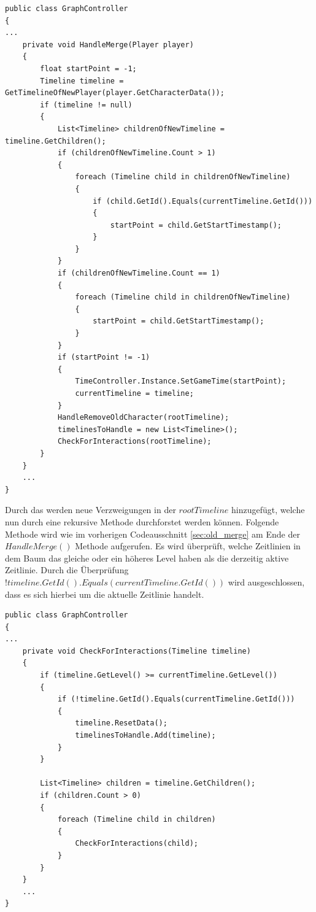 \begin{lstlisting}[caption={HandleMerge Methode aus dem alten Prototyp}, label={sec:old_merge}]
public class GraphController
{
...
    private void HandleMerge(Player player)
    {
        float startPoint = -1;
        Timeline timeline = GetTimelineOfNewPlayer(player.GetCharacterData());
        if (timeline != null)
        {
            List<Timeline> childrenOfNewTimeline = timeline.GetChildren();
            if (childrenOfNewTimeline.Count > 1)
            {
                foreach (Timeline child in childrenOfNewTimeline)
                {
                    if (child.GetId().Equals(currentTimeline.GetId()))
                    {
                        startPoint = child.GetStartTimestamp();
                    }
                }
            }
            if (childrenOfNewTimeline.Count == 1)
            {
                foreach (Timeline child in childrenOfNewTimeline)
                {
                    startPoint = child.GetStartTimestamp();
                }
            }
            if (startPoint != -1)
            {
                TimeController.Instance.SetGameTime(startPoint);
                currentTimeline = timeline;
            }
            HandleRemoveOldCharacter(rootTimeline);
            timelinesToHandle = new List<Timeline>();
            CheckForInteractions(rootTimeline);
        }
    }
    ...
}
\end{lstlisting}


Durch das  werden neue Verzweigungen in der $rootTimeline$ hinzugefügt, welche nun durch eine rekursive Methode durchforstet werden können. Folgende Methode wird wie im vorherigen Codeausschnitt \ref{sec:old_merge} am Ende der $HandleMerge()$ Methode aufgerufen. Es wird überprüft, welche Zeitlinien in dem Baum das gleiche oder ein höheres Level haben als die derzeitig aktive Zeitlinie. Durch die Überprüfung $!timeline.GetId().Equals(currentTimeline.GetId())$ wird ausgeschlossen, dass es sich hierbei um die aktuelle Zeitlinie handelt.

\begin{lstlisting}[caption={HandleMerge Methode aus dem alten Prototyp}, label={sec:old_checkForInteractions}]
public class GraphController
{
...
    private void CheckForInteractions(Timeline timeline)
    {
        if (timeline.GetLevel() >= currentTimeline.GetLevel())
        {
            if (!timeline.GetId().Equals(currentTimeline.GetId()))
            {
                timeline.ResetData();
                timelinesToHandle.Add(timeline);
            }
        }

        List<Timeline> children = timeline.GetChildren();
        if (children.Count > 0)
        {
            foreach (Timeline child in children)
            {
                CheckForInteractions(child);
            }
        }
    }
    ...
}
\end{lstlisting}

